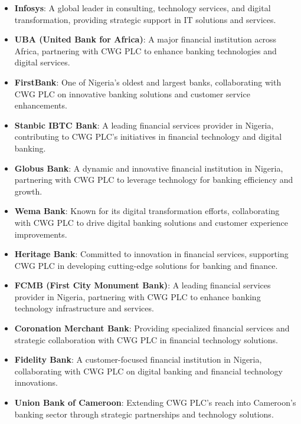 \documentclass[a4paper,12pt]{report}
\begin{document}
	\begin{itemize}
		\item \textbf{Infosys}: A global leader in consulting, technology services, and digital transformation, providing strategic support in IT solutions and services.
		
		\item \textbf{UBA (United Bank for Africa)}: A major financial institution across Africa, partnering with CWG PLC to enhance banking technologies and digital services.
		
		\item \textbf{FirstBank}: One of Nigeria's oldest and largest banks, collaborating with CWG PLC on innovative banking solutions and customer service enhancements.
		
		\item \textbf{Stanbic IBTC Bank}: A leading financial services provider in Nigeria, contributing to CWG PLC's initiatives in financial technology and digital banking.
		
		\item \textbf{Globus Bank}: A dynamic and innovative financial institution in Nigeria, partnering with CWG PLC to leverage technology for banking efficiency and growth.
		
		\item \textbf{Wema Bank}: Known for its digital transformation efforts, collaborating with CWG PLC to drive digital banking solutions and customer experience improvements.
		
		\item \textbf{Heritage Bank}: Committed to innovation in financial services, supporting CWG PLC in developing cutting-edge solutions for banking and finance.
		
		\item \textbf{FCMB (First City Monument Bank)}: A leading financial services provider in Nigeria, partnering with CWG PLC to enhance banking technology infrastructure and services.
		
		\item \textbf{Coronation Merchant Bank}: Providing specialized financial services and strategic collaboration with CWG PLC in financial technology solutions.
		
		\item \textbf{Fidelity Bank}: A customer-focused financial institution in Nigeria, collaborating with CWG PLC on digital banking and financial technology innovations.
		
		\item \textbf{Union Bank of Cameroon}: Extending CWG PLC's reach into Cameroon's banking sector through strategic partnerships and technology solutions.
	\end{itemize}
	
\end{document}
